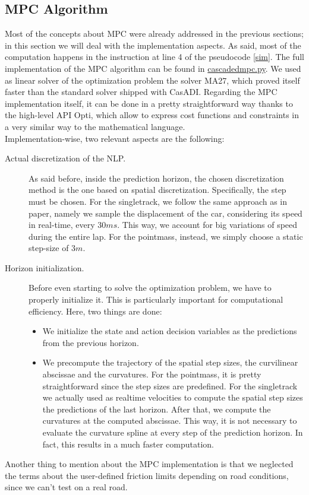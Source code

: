 \documentclass[a4paper, onecolumn, 12pt]{article}
\begin{document}
\subsection{MPC Algorithm}
Most of the concepts about MPC were already addressed in the previous sections;
in this section we will deal with the implementation aspects. As said, most of
the computation happens in the instruction at line 4 of the pseudocode
\ref{sim}. The full implementation of the MPC algorithm can be found in
\href{https://github.com/neverorfrog/vehicle-control/tree/main/controllers/mpc}{cascadedmpc.py}.
We used as linear solver of the optimization problem the solver MA27, which
proved itself faster than the standard solver shipped with CasADI. Regarding the
MPC implementation itself, it can be done in a pretty straightforward way thanks
to the high-level API Opti, which allow to express cost functions and
constraints in a very similar way to the mathematical language.\\
Implementation-wise, two relevant aspects are the following:
\begin{description}
    \item[Actual discretization of the NLP.] As said before, inside the
    prediction horizon, the chosen discretization method is the one based on
    spatial discretization. Specifically, the step must be chosen. For the
    singletrack, we follow the same approach as in paper, namely we sample the
    displacement of the car, considering its speed in real-time, every $30ms$.
    This way, we account for big variations of speed during the entire lap. For
    the pointmass, instead, we simply choose a static step-size of $3m$.
    \item[Horizon initialization.] Before even starting to solve the
    optimization problem, we have to properly initialize it. This is
    particularly important for computational efficiency. Here, two things are done:
    \begin{itemize}
        \item We initialize the state and action decision variables as the
        predictions from the previous horizon.
        \item We precompute the trajectory of the spatial step sizes, the
        curvilinear abscissae and the curvatures. For the pointmass, it is
        pretty straightforward since the step sizes are predefined. For the
        singletrack we actually used as realtime velocities to compute the
        spatial step sizes the predictions of the last horizon. After that, we
        compute the curvatures at the computed abscissae. This way, it is not
        necessary to evaluate the curvature spline at every step of the
        prediction horizon. In fact, this results in a much faster computation.
    \end{itemize}
\end{description} 
Another thing to mention about the MPC implementation is that we neglected the
terms about the user-defined friction limits depending on road conditions, since
we can't test on a real road. 
\end{document}
